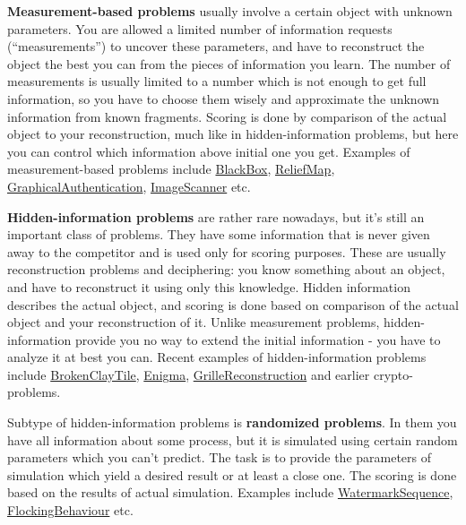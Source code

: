 \textbf{Measurement-based problems} usually involve a certain object
with unknown parameters. You are allowed a limited number of information
requests (``measurements'') to uncover these parameters, and have to
reconstruct the object the best you can from the pieces of information
you learn. The number of measurements is usually limited to a number
which is not enough to get full information, so you have to choose them
wisely and approximate the unknown information from known fragments.
Scoring is done by comparison of the actual object to your
reconstruction, much like in hidden-information problems, but here you
can control which information above initial one you get. Examples of
measurement-based problems include
\href{http://www.topcoder.com/longcontest/?module=ViewProblemStatement\&rd=14210\&pm=10807}{BlackBox},
\href{http://www.topcoder.com/longcontest/?module=ViewProblemStatement\&rd=13710\&pm=10322}{ReliefMap},
\href{http://www.topcoder.com/longcontest/?module=ViewProblemStatement\&rd=13568\&pm=10147}{GraphicalAuthentication},
\href{http://community.topcoder.com/longcontest/?module=ViewProblemStatement\&rd=14502\&pm=11367}{ImageScanner}
etc.

\textbf{Hidden-information problems} are rather rare nowadays, but it's
still an important class of problems. They have some information that is
never given away to the competitor and is used only for scoring
purposes. These are usually reconstruction problems and deciphering: you
know something about an object, and have to reconstruct it using only
this knowledge. Hidden information describes the actual object, and
scoring is done based on comparison of the actual object and your
reconstruction of it. Unlike measurement problems, hidden-information
provide you no way to extend the initial information - you have to
analyze it at best you can. Recent examples of hidden-information
problems include
\href{http://www.topcoder.com/longcontest/?module=ViewProblemStatement\&rd=14207\&pm=10756}{BrokenClayTile},
\href{http://www.topcoder.com/longcontest/?module=ViewProblemStatement\&rd=14176\&pm=10676}{Enigma},
\href{http://www.topcoder.com/longcontest/?module=ViewProblemStatement\&rd=13680\&pm=10276}{GrilleReconstruction}
and earlier crypto-problems.

Subtype of hidden-information problems is \textbf{randomized problems}.
In them you have all information about some process, but it is simulated
using certain random parameters which you can't predict. The task is to
provide the parameters of simulation which yield a desired result or at
least a close one. The scoring is done based on the results of actual
simulation. Examples include
\href{http://www.topcoder.com/longcontest/?module=ViewProblemStatement\&rd=13681\&pm=10293}{WatermarkSequence},
\href{http://www.topcoder.com/longcontest/?module=ViewProblemStatement\&rd=13567\&pm=10119}{FlockingBehaviour}
etc.

